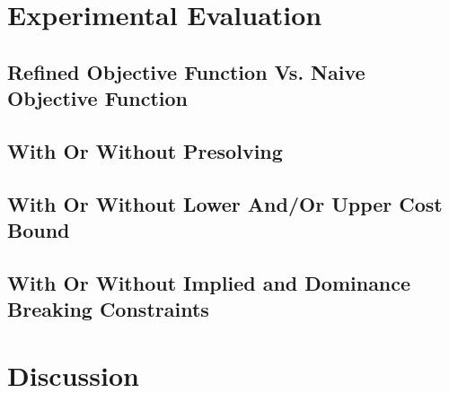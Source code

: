 \section{Experimental Evaluation}
\subsection{Refined Objective Function Vs. Naive Objective Function}
\subsection{With Or Without Presolving}
\subsection{With Or Without Lower And/Or Upper Cost Bound}
\subsection{With Or Without Implied and Dominance Breaking Constraints}

\section{Discussion}
